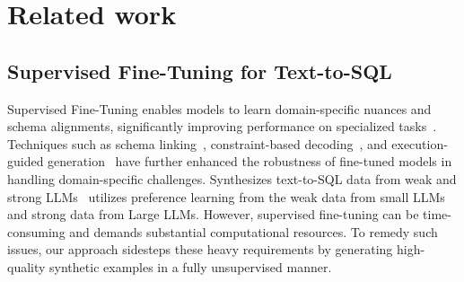 

\section{Related work}



\subsection{Supervised Fine-Tuning for Text-to-SQL}
Supervised Fine-Tuning enables models to learn domain-specific nuances and schema alignments, significantly improving performance on specialized tasks~\cite{sft_enhancing}. Techniques such as schema linking~\cite{schema_enhance}, constraint-based decoding~\cite{autoregressive_decoding}, and execution-guided generation~\cite{tool_assisted} have further enhanced the robustness of fine-tuned models in handling domain-specific challenges. Synthesizes text-to-SQL data from weak and strong LLMs~\cite{synthesize} utilizes preference learning from the weak data from small LLMs and strong data from Large LLMs. %
However, supervised fine-tuning can be time-consuming and demands substantial computational resources. To remedy such issues, our approach sidesteps these heavy requirements by generating high-quality synthetic examples in a fully unsupervised manner.

